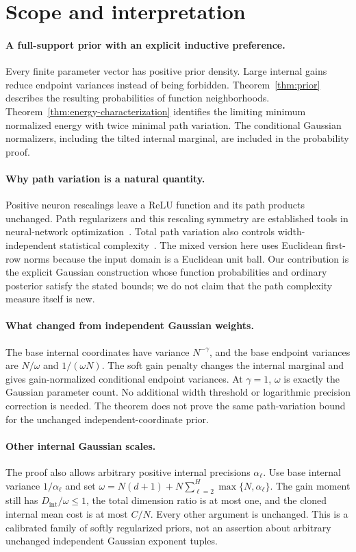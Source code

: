 \section{Scope and interpretation}
\paragraph{A full-support prior with an explicit inductive preference.}
Every finite parameter vector has positive prior density. Large internal gains reduce endpoint variances instead of being forbidden. Theorem~\ref{thm:prior} describes the resulting probabilities of function neighborhoods. Theorem~\ref{thm:energy-characterization} identifies the limiting minimum normalized energy with twice minimal path variation. The conditional Gaussian normalizers, including the tilted internal marginal, are included in the probability proof.

\paragraph{Why path variation is a natural quantity.}
Positive neuron rescalings leave a ReLU function and its path products unchanged. Path regularizers and this rescaling symmetry are established tools in neural-network optimization~\cite{path-sgd}. Total path variation also controls width-independent statistical complexity~\cite{barron-klusowski}. The mixed version here uses Euclidean first-row norms because the input domain is a Euclidean unit ball. Our contribution is the explicit Gaussian construction whose function probabilities and ordinary posterior satisfy the stated bounds; we do not claim that the path complexity measure itself is new.

\paragraph{What changed from independent Gaussian weights.}
The base internal coordinates have variance $N^{-\gamma}$, and the base endpoint variances are $N/\omega$ and $1/(\omega N)$. The soft gain penalty changes the internal marginal and gives gain-normalized conditional endpoint variances. At $\gamma=1$, $\omega$ is exactly the Gaussian parameter count. No additional width threshold or logarithmic precision correction is needed. The theorem does not prove the same path-variation bound for the unchanged independent-coordinate prior.

\paragraph{Other internal Gaussian scales.}
The proof also allows arbitrary positive internal precisions $\alpha_\ell$. Use base internal variance $1/\alpha_\ell$ and set
$\omega=N(d+1)+N\sum_{\ell=2}^H\max\{N,\alpha_\ell\}$.
The gain moment still has $D_{\mathrm{int}}/\omega\le1$, the total dimension ratio is at most one, and the cloned internal mean cost is at most $C/N$. Every other argument is unchanged. This is a calibrated family of softly regularized priors, not an assertion about arbitrary unchanged independent Gaussian exponent tuples.

